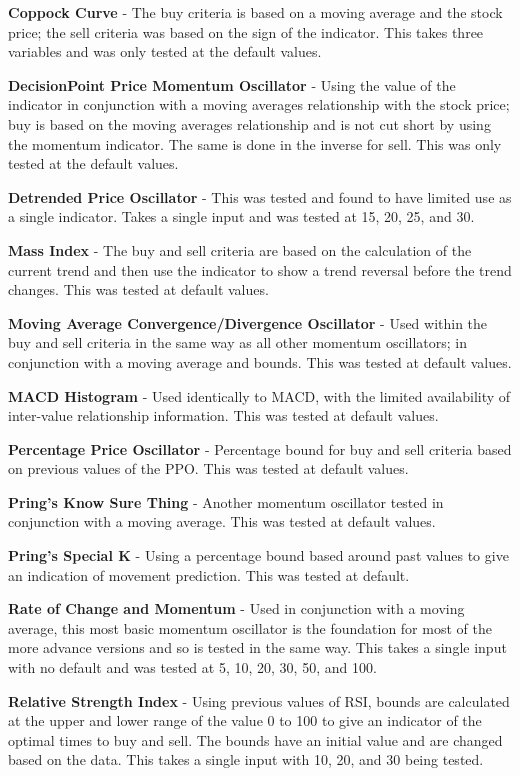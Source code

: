 \documentclass[conference]{IEEEtran}
\begin{document}
\textbf{Coppock Curve} - The buy criteria is based on a moving average and the stock price; the sell criteria was based on the sign of the indicator. This takes three variables and was only tested at the default values.

\textbf{DecisionPoint Price Momentum Oscillator} - Using the value of the indicator in conjunction with a moving averages relationship with the stock price; buy is based on the moving averages relationship and is not cut short by using the momentum indicator. The same is done in the inverse for sell. This was only tested at the default values.

\textbf{Detrended Price Oscillator} - This was tested and found to have limited use as a single indicator. Takes a single input and was tested at 15, 20, 25, and 30.

\textbf{Mass Index} - The buy and sell criteria are based on the calculation of the current trend and then use the indicator to show a trend reversal before the trend changes. This was tested at default values.

\textbf{Moving Average Convergence/Divergence Oscillator} - Used within the buy and sell criteria in the same way as all other momentum oscillators; in conjunction with a moving average and bounds. This was tested at default values.

\textbf{MACD Histogram} - Used identically to MACD, with the limited availability of inter-value relationship information. This was tested at default values. 

\textbf{Percentage Price Oscillator} - Percentage bound for buy and sell criteria based on previous values of the PPO. This was tested at default values.

\textbf{Pring's Know Sure Thing} - Another momentum oscillator tested in conjunction with a moving average. This was tested at default values.

\textbf{Pring's Special K} - Using a percentage bound based around past values to give an indication of movement prediction. This was tested at default. 

\textbf{Rate of Change and Momentum} - Used in conjunction with a moving average, this most basic momentum oscillator is the foundation for most of the more advance versions and so is tested in the same way. This takes a single input with no default and was tested at 5, 10, 20, 30, 50, and 100.

\textbf{Relative Strength Index} - Using previous values of RSI, bounds are calculated at the upper and lower range of the value 0 to 100 to give an indicator of the optimal times to buy and sell. The bounds have an initial value and are changed based on the data. This takes a single input with 10, 20, and 30 being tested.
\end{document}
